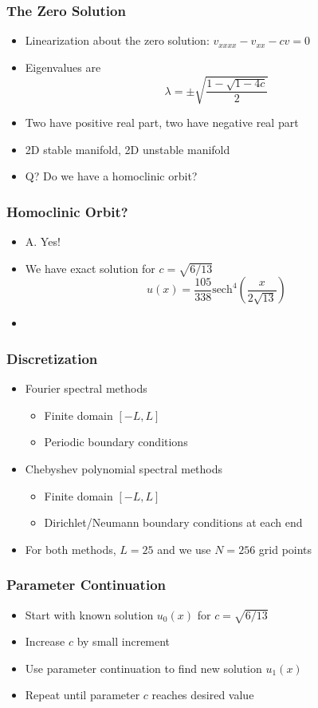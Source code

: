 \documentclass[16pt]{beamer}
\begin{document}
\begin{frame}
	\frametitle{The Zero Solution}
	\begin{itemize}
		\item<1->Linearization about the zero solution: $v_{xxxx} - v_{xx} - c v = 0$
		\item<2->Eigenvalues are 
		\[
		\lambda = \pm \sqrt{ \frac{1 - \sqrt{1 - 4c } }{ 2} }
		\] 
		\item<3->Two have positive real part, two have negative real part
		\item<4->2D stable manifold, 2D unstable manifold
		\item<5->Q? Do we have a homoclinic orbit?
	\end{itemize}
\end{frame}

\begin{frame}
	\frametitle{Homoclinic Orbit?}
	\begin{itemize}
		\item<1->A. Yes!
		\item<2->We have exact solution for $c = \sqrt{6/13}$
		\[
		u(x) = \frac{105}{338}\text{sech}^4\left( \frac{x}{2\sqrt{13}}\right) 
		\]
		\item<3->
	\end{itemize}
\end{frame}

\begin{frame}
	\frametitle{Discretization}
	\begin{itemize} 
		\item Fourier spectral methods
		\begin{itemize} 
			\item Finite domain $[-L, L]$
			\item Periodic boundary conditions
		\end{itemize}
		\item Chebyshev polynomial spectral methods
		\begin{itemize} 
			\item Finite domain $[-L, L]$
			\item Dirichlet/Neumann boundary conditions at each end
		\end{itemize}
		\item For both methods, $L = 25$ and we use $N = 256$ grid points
	\end{itemize}
\end{frame}

\begin{frame}
	\frametitle{Parameter Continuation}
	\begin{itemize}
		\item Start with known solution $u_0(x)$ for $c = \sqrt{6/13}$
		\item Increase $c$ by small increment
		\item Use parameter continuation to find new solution $u_1(x)$
		\item Repeat until parameter $c$ reaches desired value 
	\end{itemize}
\end{frame}
\end{document}
